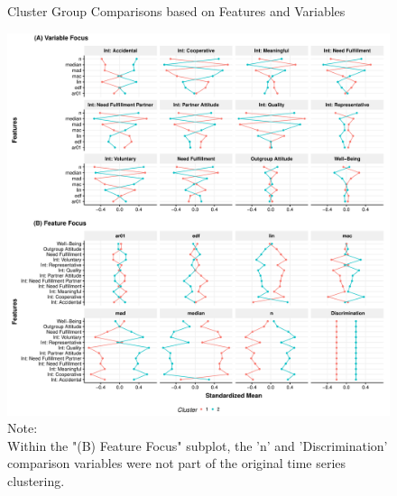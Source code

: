 \begin{figure}[!ht] %
  \caption{Cluster Group Comparisons based on Features and Variables}
  \label{fig:clusterFeatVar}
  \centering\includegraphics[width=\textwidth]{figures/clusterFeatVarComb.pdf}
  \caption*{Note: \\
  Within the "(B) Feature Focus" subplot, the 'n' and 'Discrimination' comparison variables were not part of the original time series clustering.}
\end{figure}

